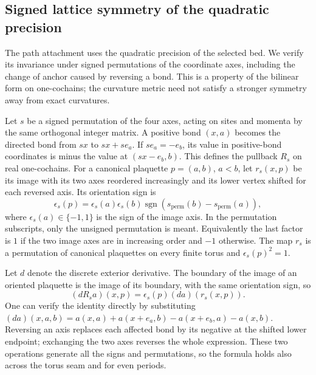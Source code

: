 \subsection{Signed lattice symmetry of the quadratic precision}
\label{sec:quadratic-lattice-symmetry}
The path attachment uses the quadratic precision of the selected bed.
We verify its invariance under signed permutations of the coordinate axes,
including the change of anchor caused by reversing a bond. This is a
property of the bilinear form on one-cochains; the curvature metric need
not satisfy a stronger symmetry away from exact curvatures.

Let $s$ be a signed permutation of the four axes, acting on sites and
momenta by the same orthogonal integer matrix. A positive bond $(x,a)$
becomes the directed bond from $sx$ to $sx+s e_a$. If $s e_a=-e_b$,
its value in positive-bond coordinates is minus the value at $(sx-e_b,b)$.
This defines the pullback $R_s$ on real one-cochains. For a canonical
plaquette $p=(a,b)$, $a<b$, let $r_s(x,p)$ be its image with its two
axes reordered increasingly and its lower vertex shifted for each
reversed axis. Its orientation sign is
\[
 \epsilon_s(p)=\epsilon_s(a)\epsilon_s(b)
                   \operatorname{sgn}(s_{\mathrm{perm}}(b)-s_{\mathrm{perm}}(a)),
\]
where $\epsilon_s(a)\in\{-1,1\}$ is the sign of the image axis.
In the permutation subscripts, only the unsigned permutation is meant.
Equivalently the last factor is $1$ if the two image axes are in
increasing order and $-1$ otherwise. The map $r_s$ is a permutation of
canonical plaquettes on every finite torus and $\epsilon_s(p)^2=1$.

Let $d$ denote the discrete exterior derivative. The boundary of the
image of an oriented plaquette is the image of its boundary, with the
same orientation sign, so
\begin{equation}\label{eq:quadratic-curl-rotation}
       (dR_sa)(x,p)=\epsilon_s(p)(da)(r_s(x,p)).
\end{equation}
One can verify the identity directly by substituting
$(da)(x,a,b)=a(x,a)+a(x+e_a,b)-a(x+e_b,a)-a(x,b)$.
Reversing an axis replaces each affected bond by its negative at the
shifted lower endpoint; exchanging the two axes reverses the whole
expression. These two operations generate all the signs and permutations,
so the formula holds also across the torus seam and for even periods.


